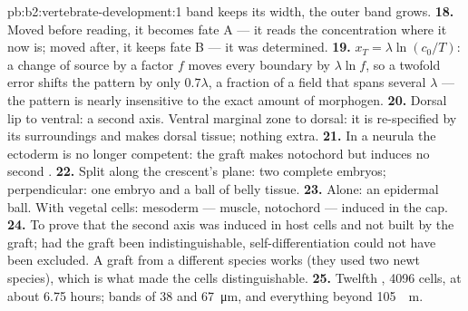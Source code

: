 \begin{solution}{pb:b2:vertebrate-development:1}
band keeps its width, the outer band grows.
\textbf{18.} Moved before reading, it becomes fate A --- it reads the
concentration where it now is; moved after, it keeps fate B --- it
was determined.
\textbf{19.} $x_T = \lambda\ln(c_0/T)$: a change of source by a factor
$f$ moves every boundary by $\lambda\ln f$, so a twofold error
shifts the pattern by only $0.7\lambda$, a fraction of a field that
spans several $\lambda$ --- the pattern is nearly insensitive to the
exact amount of morphogen.
\textbf{20.} Dorsal lip to ventral: a second axis. Ventral marginal
zone to dorsal: it is re-specified by its surroundings and makes
dorsal tissue; nothing extra.
\textbf{21.} In a neurula the ectoderm is no longer competent: the
graft makes notochord but induces no second .
\textbf{22.} Split along the crescent's plane: two complete embryos;
perpendicular: one embryo and a ball of belly tissue.
\textbf{23.} Alone: an epidermal ball. With vegetal cells: mesoderm
--- muscle, notochord --- induced in the cap.
\textbf{24.} To prove that the second axis was induced in host cells
and not built by the graft; had the graft been indistinguishable,
self-differentiation could not have been excluded. A graft from a
different species works (they used two newt species), which is what
made the cells distinguishable.
\textbf{25.} Twelfth , 4096 cells, at about 6.75 hours; bands
of 38 and \qty{67}{\micro m}, and everything beyond \qty{105}{\micro
m}.
\end{solution}
